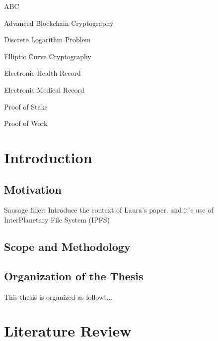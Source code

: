 \documentclass[cic,tc,english]{iiufrgs}
\begin{document}
\listoffigures

\listoftables

\begin{listofabbrv}{ABC} %
    \item[ABC] Advanced Blockchain Cryptography
    \item[DLP] Discrete Logarithm Problem
    \item[ECC] Elliptic Curve Cryptography
    \item[EHR] Electronic Health Record
    \item[EMR] Electronic Medical Record
    \item[PoS] Proof of Stake
    \item[PoW] Proof of Work
\end{listofabbrv}


\tableofcontents


\chapter{Introduction}

\section{Motivation}
Sausage filler: Introduce the context of Laura's paper. \cite{laura2023} and it's use of InterPlanetary File System (IPFS) \cite{benet2013ipfs}

\section{Scope and Methodology}


\section{Organization of the Thesis}
This thesis is organized as follows...


\chapter{Literature Review}
\end{document}
